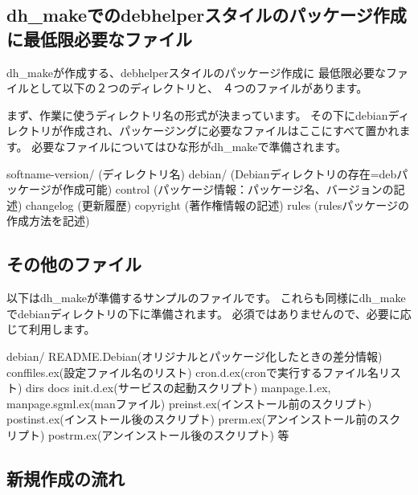 \documentclass[mingoth,a4paper]{jsarticle}
\begin{document}
\subsection{dh\_makeでのdebhelperスタイルのパッケージ作成に最低限必要なファイル}

dh\_makeが作成する、debhelperスタイルのパッケージ作成に
最低限必要なファイルとして以下の２つのディレクトリと、
４つのファイルがあります。

まず、作業に使うディレクトリ名の形式が決まっています。
その下にdebianディレクトリが作成され、パッケージングに必要なファイルはここにすべて置かれます。
必要なファイルについてはひな形がdh\_makeで準備されます。
\begin{commandline}
softname-version/ (ディレクトリ名)
  debian/ (Debianディレクトリの存在=debパッケージが作成可能)
     control (パッケージ情報：パッケージ名、バージョンの記述)
     changelog (更新履歴)
     copyright (著作権情報の記述)
     rules (rulesパッケージの作成方法を記述)
\end{commandline}

\subsection{その他のファイル}

以下はdh\_makeが準備するサンプルのファイルです。
これらも同様にdh\_makeでdebianディレクトリの下に準備されます。
必須ではありませんので、必要に応じて利用します。

\begin{commandline}
debian/
  README.Debian(オリジナルとパッケージ化したときの差分情報)
  conffiles.ex(設定ファイル名のリスト)
  cron.d.ex(cronで実行するファイル名リスト)
  dirs
  docs
  init.d.ex(サービスの起動スクリプト)
  manpage.1.ex, manpage.sgml.ex(manファイル)
  preinst.ex(インストール前のスクリプト)
  postinst.ex(インストール後のスクリプト)
  prerm.ex(アンインストール前のスクリプト)
  postrm.ex(アンインストール後のスクリプト)
  等
\end{commandline}

\subsection{新規作成の流れ}
\end{document}
